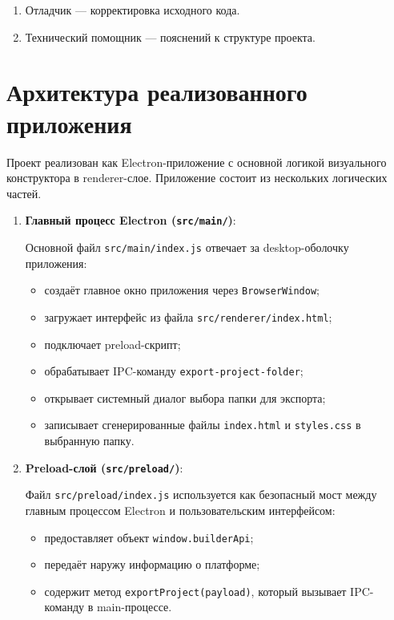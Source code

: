 \documentclass[14pt,a4paper]{extarticle}
\begin{document}
{{\begin{enumerate}
    \item Отладчик --- корректировка исходного кода.

    \item Технический помощник --- пояснений к структуре проекта.
\end{enumerate}

\newpage
\section{Архитектура реализованного приложения}

Проект реализован как Electron-приложение с основной логикой визуального конструктора в renderer-слое. Приложение состоит из нескольких логических частей.

\begin{enumerate}
    \item \textbf{Главный процесс Electron (\texttt{src/main/})}:

    Основной файл \texttt{src/main/index.js} отвечает за desktop-оболочку приложения:
    \begin{itemize}
        \item создаёт главное окно приложения через \texttt{BrowserWindow};
        \item загружает интерфейс из файла \texttt{src/renderer/index.html};
        \item подключает preload-скрипт;
        \item обрабатывает IPC-команду \texttt{export-project-folder};
        \item открывает системный диалог выбора папки для экспорта;
        \item записывает сгенерированные файлы \texttt{index.html} и \texttt{styles.css} в выбранную папку.
    \end{itemize}

    \item \textbf{Preload-слой (\texttt{src/preload/})}:

    Файл \texttt{src/preload/index.js} используется как безопасный мост между главным процессом Electron и пользовательским интерфейсом:
    \begin{itemize}
        \item предоставляет объект \texttt{window.builderApi};
        \item передаёт наружу информацию о платформе;
        \item содержит метод \texttt{exportProject(payload)}, который вызывает IPC-команду в main-процессе.
    \end{itemize}


\end{enumerate}}}
\end{document}
